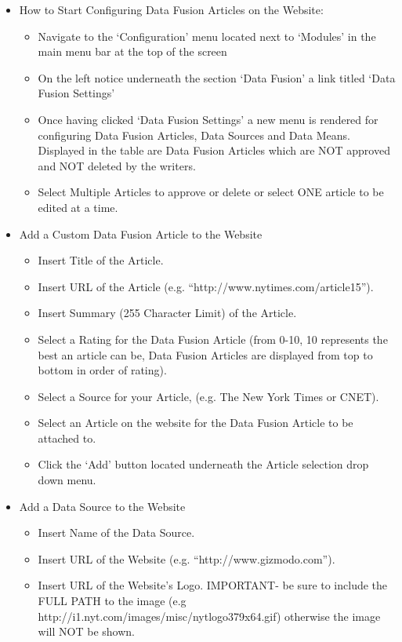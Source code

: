 \documentclass[10pt]{article} %
\begin{document}
\begin{itemize}
\item How to Start Configuring Data Fusion Articles on the Website:
	\begin{itemize}
	\itemindent 10pt
	\item Navigate to the ‘Configuration’ menu located next to ‘Modules’ in the main menu bar at the top of the screen
	\item On the left notice underneath the section ‘Data Fusion’ a link titled ‘Data Fusion Settings’
	\item Once having clicked ‘Data Fusion Settings’ a new menu is rendered for configuring Data Fusion Articles, Data Sources and Data Means. Displayed in the table are Data Fusion Articles which are NOT approved and NOT deleted by the writers.
	\item Select Multiple Articles to approve or delete or select ONE article to be edited at a time.
	\end{itemize}
\item Add a Custom Data Fusion Article to the Website
	\begin{itemize}
	\itemindent 10pt
	\item Insert Title of the Article.
	\item Insert URL of the Article (e.g. “http://www.nytimes.com/article15”).
	\item Insert Summary (255 Character Limit) of the Article.
	\item  Select a Rating for the Data Fusion Article (from 0-10, 10 represents the best an article can be, Data Fusion Articles are displayed from top to bottom in order of rating).
	\item Select a Source for your Article, (e.g. The New York Times or CNET).   
	\item Select an Article on the website for the Data Fusion Article to be attached to.
	\item Click the ‘Add’ button located underneath the Article selection drop down menu.
	\end{itemize}
\item Add a Data Source to the Website
	\begin{itemize}
	\itemindent 10pt
	\item Insert Name of the Data Source.
	\item Insert URL of the Website (e.g. “http://www.gizmodo.com”).
	\item Insert URL of the Website’s Logo. IMPORTANT- be sure to include the FULL PATH to the image (e.g http://i1.nyt.com/images/misc/nytlogo379x64.gif) otherwise the image will NOT be shown.

\end{itemize}
\end{itemize}
\end{document}

